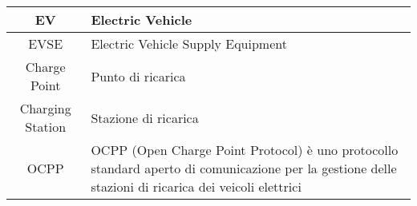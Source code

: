 \begin{tabular}{|c|p{10cm}|} %
\hline
EV & Electric Vehicle \\
\hline
EVSE & Electric Vehicle Supply Equipment \\
\hline
Charge Point & Punto di ricarica \\
\hline
Charging Station & Stazione di ricarica \\
\hline
OCPP & OCPP (Open Charge Point Protocol) è uno protocollo standard aperto di comunicazione per la gestione delle stazioni di ricarica dei veicoli elettrici \\
\hline
\end{tabular}

